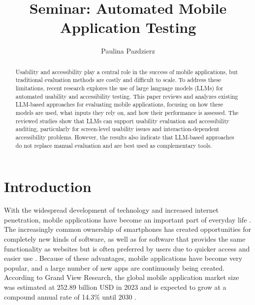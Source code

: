 \documentclass[acmsmall,nonacm]{acmart}
\begin{document}
\title{Seminar: Automated Mobile Application Testing}

\author{Paulina Pazdzierz}

\begin{abstract}
Usability and accessibility play a central role in the success of mobile applications, but traditional evaluation methods are costly and difficult to scale. To address these limitations, recent research explores the use of large language models (LLMs) for automated usability and accessibility testing. This paper reviews and analyzes existing LLM-based approaches for evaluating mobile applications, focusing on how these models are used, what inputs they rely on, and how their performance is assessed. The reviewed studies show that LLMs can support usability evaluation and accessibility auditing, particularly for screen-level usability issues and interaction-dependent accessibility problems. However, the results also indicate that LLM-based approaches do not replace manual evaluation and are best used as complementary tools.
\end{abstract}


\maketitle

\section{Introduction}

With the widespread development of technology and increased internet penetration, mobile applications have become an important part of everyday life \cite{lu2021ux_mobile_apps}. The increasingly common ownership of smartphones has created opportunities for completely new kinds of software, as well as for software that provides the same functionality as websites but is often preferred by users due to quicker access and easier use \cite{islam2010mobile_application}. Because of these advantages, mobile applications have become very popular, and a large number of new apps are continuously being created. According to Grand View Research, the global mobile application market size was estimated at 252.89 billion USD in 2023 and is expected to grow at a compound annual rate of 14.3\% until 2030 \cite{grandview2024mobile_market}.
\end{document}
